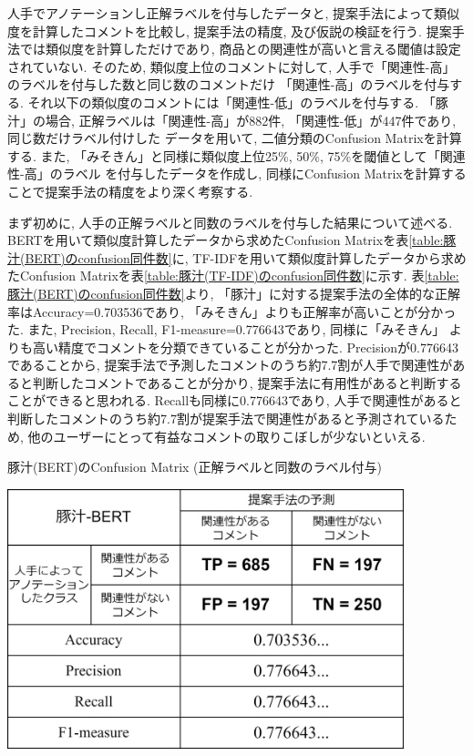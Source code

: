 \documentclass{ltjarticle}
\begin{document}
人手でアノテーションし正解ラベルを付与したデータと, 提案手法によって類似度を計算したコメントを比較し, 
提案手法の精度, 及び仮説の検証を行う. 
提案手法では類似度を計算しただけであり, 商品との関連性が高いと言える閾値は設定されていない. 
そのため, 類似度上位のコメントに対して, 人手で「関連性-高」のラベルを付与した数と同じ数のコメントだけ
「関連性-高」のラベルを付与する. 
それ以下の類似度のコメントには「関連性-低」のラベルを付与する. 
「豚汁」の場合, 正解ラベルは「関連性-高」が882件, 「関連性-低」が447件であり, 同じ数だけラベル付けした
データを用いて, 二値分類のConfusion Matrixを計算する. 
また, 「みそきん」と同様に類似度上位25\%, 50\%, 75\%を閾値として「関連性-高」のラベル
を付与したデータを作成し, 同様にConfusion Matrixを計算することで提案手法の精度をより深く考察する. 

まず初めに, 人手の正解ラベルと同数のラベルを付与した結果について述べる. 
BERTを用いて類似度計算したデータから求めたConfusion Matrixを表\ref{table:豚汁(BERT)のconfusion同件数}に, 
TF-IDFを用いて類似度計算したデータから求めたConfusion Matrixを表\ref{table:豚汁(TF-IDF)のconfusion同件数}に示す. 
表\ref{table:豚汁(BERT)のconfusion同件数}より, 「豚汁」に対する提案手法の全体的な正解率はAccuracy=0.703536であり, 
「みそきん」よりも正解率が高いことが分かった. また, Precision, Recall, F1-measure=0.776643であり, 同様に「みそきん」
よりも高い精度でコメントを分類できていることが分かった. Precisionが0.776643であることから, 
提案手法で予測したコメントのうち約7.7割が人手で関連性があると判断したコメントであることが分かり, 提案手法に有用性があると判断することができると思われる. 
Recallも同様に0.776643であり, 人手で関連性があると判断したコメントのうち約7.7割が提案手法で関連性があると予測されているため, 
他のユーザーにとって有益なコメントの取りこぼしが少ないといえる. 
\newpage
\begin{table}[ht]
    \centering
    \caption{豚汁(BERT)のConfusion Matrix (正解ラベルと同数のラベル付与)}
    \vspace{5truept}

    \includegraphics[width = 11.5cm]{images/豚汁images/豚汁Confusion_BERT同件数.drawio.png}
    \label{table:豚汁(BERT)のconfusion同件数}
\end{table}
\vspace{10truept}
\end{document}
